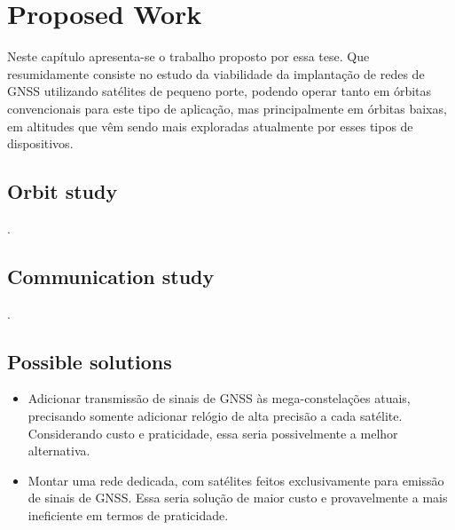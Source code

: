 %
%
%
%
%

%
%
%
%
%


\chapter{Proposed Work} \label{ch:proposed-work}

Neste capítulo apresenta-se o trabalho proposto por essa tese. Que resumidamente consiste no estudo da viabilidade da implantação de redes de GNSS utilizando satélites de pequeno porte, podendo operar tanto em órbitas convencionais para este tipo de aplicação, mas principalmente em órbitas baixas, em altitudes que vêm sendo mais exploradas atualmente por esses tipos de dispositivos.

\section{Orbit study}

.

\section{Communication study}

.

\section{Possible solutions}

\begin{itemize}
    \item Adicionar transmissão de sinais de GNSS às mega-constelações atuais, precisando somente adicionar relógio de alta precisão a cada satélite. Considerando custo e praticidade, essa seria possivelmente a melhor alternativa.
    \item Montar uma rede dedicada, com satélites feitos exclusivamente para emissão de sinais de GNSS. Essa seria solução de maior custo e provavelmente a mais ineficiente em termos de praticidade.
\end{itemize}
